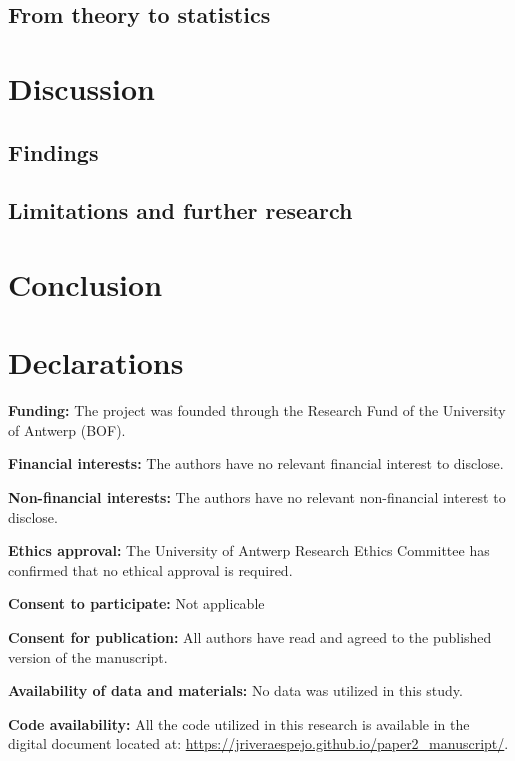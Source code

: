 \documentclass[
  authoryear,
  review,
  1p]{elsarticle}
\begin{document}
\subsection{From theory to statistics}\label{sec-theory-statistics}

\section{Discussion}\label{sec-discuss}

\subsection{Findings}\label{sec-discuss-finding}

\subsection{Limitations and further
research}\label{sec-discuss-limitations}

\section{Conclusion}\label{sec-conclusion}

\newpage{}

\section*{Declarations}\label{declarations}

\textbf{Funding:} The project was founded through the Research Fund of
the University of Antwerp (BOF).

\textbf{Financial interests:} The authors have no relevant financial
interest to disclose.

\textbf{Non-financial interests:} The authors have no relevant
non-financial interest to disclose.

\textbf{Ethics approval:} The University of Antwerp Research Ethics
Committee has confirmed that no ethical approval is required.

\textbf{Consent to participate:} Not applicable

\textbf{Consent for publication:} All authors have read and agreed to
the published version of the manuscript.

\textbf{Availability of data and materials:} No data was utilized in
this study.

\textbf{Code availability:} All the code utilized in this research is
available in the digital document located at:
\url{https://jriveraespejo.github.io/paper2_manuscript/}.
\end{document}
